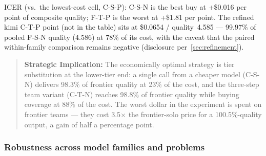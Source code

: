 \documentclass[12pt,a4paper]{article}
\begin{document}
ICER (vs.\ the lowest-cost cell, C-S-P): C-S-N is the best buy at +\$0.016 per
point of composite quality; F-T-P is the worst at +\$1.81 per point. The
refined kimi C-T-P point (not in the table) sits at \$0.0654 / quality~4.585 ---
99.97\% of pooled F-S-N quality (4.586) at 78\% of its cost, with the caveat
that the paired within-family comparison remains negative (disclosure
per~\cref{sec:refinement}).

\begin{quote}
\textbf{Strategic Implication:} The economically optimal strategy is tier
substitution at the lower-tier end: a single call from a cheaper model
(C-S-N) delivers 98.3\% of frontier quality at 23\% of the cost, and the
three-step team variant (C-T-N) reaches 98.8\% of frontier quality while
buying coverage at 88\% of the cost. The worst
dollar in the experiment is spent on frontier teams --- they cost
3.5$\times$ the frontier-solo price for a 100.5\%-quality output, a gain of
half a percentage point.
\end{quote}

\subsubsection{Robustness across model families and problems}\label{sec:robustness-families}
\end{document}
